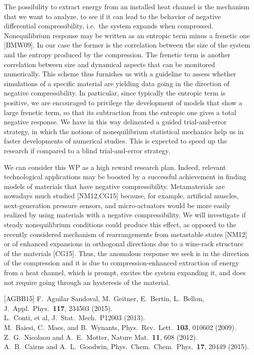 \begin{workpackage}[id=WPcompress,wphases=0-48,
  short=Nonequilibrium compressibility, %
  title=Nonequilibrium compressibility, %
  lead=UNIPD,
  UNIPDRM=48]
\begin{wpdescription}
The possibility to extract energy from an installed heat channel is the mechanism that we want to
analyze, to see if it can lead to the behavior of negative differential compressibility,
i.e.~the system expands when compressed. 
Nonequilibrium response may be written as an entropic term minus a frenetic one [BMW09].
In our case the former is the correlation between the size of the system and the entropy produced by the compression.
The frenetic term is another correlation between size and dynamical aspects that can be monitored numerically.
This scheme thus furnishes us with a guideline to assess whether simulations of a specific material are yielding data 
going in the direction of negative compressibility. In particular, since typically the entropic term is positive, we
are encouraged to privilege the development of models that show a large frenetic term, so that its subtraction from
the entropic one gives a total negative response.
We have in this way delineated a guided trial-and-error strategy, in which the notions of 
nonequilibrium statistical mechanics help us in faster developments of numerical studies. This is expected to
speed up the research if compared to a blind trial-and-error strategy.


We can consider this WP as a high reward research plan. Indeed, relevant technological applications
may be boosted by a successful achievement in finding models of materials that have negative compressibility.
Metamaterials are nowadays much studied [NM12,CG15] because, for example, artificial muscles, 
next-generation pressure sensors, and micro-actuators would be
more easily realized by using materials with a negative compressibility. We will investigate
if steady nonequilibrium conditions could produce this effect, as opposed to the recently considered 
mechanism of rearrangements from metastable states [NM12] or of enhanced expansions in orthogonal directions
due to a wine-rack structure of the materials [CG15]. Thus, the anomalous response we seek is in the direction 
of the compression and it is due to compression-enhanced extraction of energy from a heat channel,
which is prompt, excites the system expanding it, 
and does not require going through an hysteresis of the material. 

[AGBB15]  F.\ Aguilar Sandoval, M.\ Geitner, E.\ Bertin, L.\ Bellon, J.\ Appl.\ Phys.\ {\bf 117}, 234503 (2015).\\
[Cet13] L.\ Conti, et al, J.\ Stat.\ Mech.\ P12003 (2013).\\
[BMW09]  M.\ Baiesi, C.\ Maes,  and B.\ Wynants, Phys.\ Rev.\ Lett.\ {\bf 103}, 010602 (2009).\\
[NM12] Z.\ G.\ Nicolaou and A.\ E.\ Motter, Nature Mat.\ {\bf 11}, 608 (2012). \\
[CG15] A.\ B.\ Cairns and   A.\ L.\ Goodwin, Phys.\ Chem.\ Chem.\ Phys.\ {\bf 17}, 20449 (2015). 




\end{wpdescription}
\end{workpackage}
